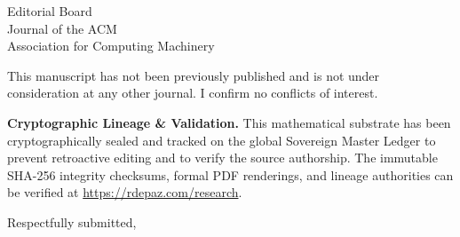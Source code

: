 \documentclass[12pt, a4paper]{letter}
\begin{document}
\begin{letter}{Editorial Board \\ Journal of the ACM \\ Association for Computing Machinery}
\medskip

This manuscript has not been previously published and is not under consideration
at any other journal. I confirm no conflicts of interest.

\textbf{Cryptographic Lineage \& Validation.} This mathematical substrate has been cryptographically sealed and tracked on the global Sovereign Master Ledger to prevent retroactive editing and to verify the source authorship. The immutable SHA-256 integrity checksums, formal PDF renderings, and lineage authorities can be verified at \url{https://rdepaz.com/research}.

\medskip

\closing{Respectfully submitted,}
\end{letter}
\end{document}
